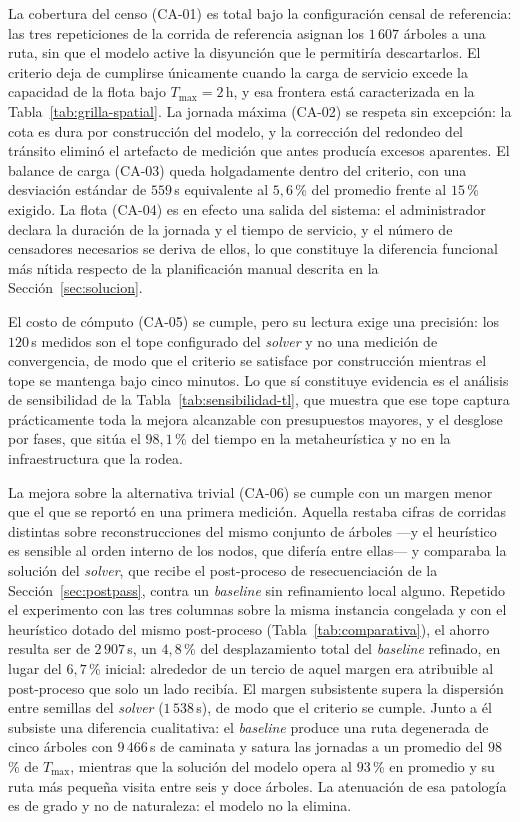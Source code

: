 La cobertura del censo (CA-01) es total bajo la configuración censal de referencia:
las tres repeticiones de la corrida de referencia asignan los $1\,607$ árboles a una
ruta, sin que el modelo active la disyunción que le permitiría descartarlos. El
criterio deja de cumplirse únicamente cuando la carga de servicio excede la capacidad
de la flota bajo $T_{\max}=2$\,h, y esa frontera está caracterizada en la
Tabla~\ref{tab:grilla-spatial}. La jornada máxima (CA-02) se respeta sin excepción:
la cota es dura por construcción del modelo, y la corrección del redondeo del tránsito
eliminó el artefacto de medición que antes producía excesos aparentes. El balance de
carga (CA-03) queda holgadamente dentro del criterio, con una desviación estándar de
$559$\,s equivalente al $5{,}6$\,\% del promedio frente al $15$\,\% exigido. La flota
(CA-04) es en efecto una salida del sistema: el administrador declara la duración de
la jornada y el tiempo de servicio, y el número de censadores necesarios se deriva de
ellos, lo que constituye la diferencia funcional más nítida respecto de la
planificación manual descrita en la Sección~\ref{sec:solucion}.

El costo de cómputo (CA-05) se cumple, pero su lectura exige una precisión: los
$120$\,s medidos son el tope configurado del \textit{solver} y no una medición de
convergencia, de modo que el criterio se satisface por construcción mientras el tope
se mantenga bajo cinco minutos. Lo que sí constituye evidencia es el análisis de
sensibilidad de la Tabla~\ref{tab:sensibilidad-tl}, que muestra que ese tope captura
prácticamente toda la mejora alcanzable con presupuestos mayores, y el desglose por
fases, que sitúa el $98{,}1$\,\% del tiempo en la metaheurística y no en la
infraestructura que la rodea.

La mejora sobre la alternativa trivial (CA-06) se cumple con un margen menor que el
que se reportó en una primera medición. Aquella restaba cifras de corridas distintas
sobre reconstrucciones del mismo conjunto de árboles ---y el heurístico es sensible al
orden interno de los nodos, que difería entre ellas--- y comparaba la solución del
\textit{solver}, que recibe el post-proceso de resecuenciación de la
Sección~\ref{sec:postpass}, contra un \textit{baseline} sin refinamiento local alguno.
Repetido el experimento con las tres columnas sobre la misma instancia congelada y con
el heurístico dotado del mismo post-proceso (Tabla~\ref{tab:comparativa}), el ahorro
resulta ser de $2\,907$\,s, un $4{,}8$\,\% del desplazamiento total del
\textit{baseline} refinado, en lugar del $6{,}7$\,\% inicial: alrededor de un tercio de
aquel margen era atribuible al post-proceso que solo un lado recibía. El margen
subsistente supera la dispersión entre semillas del \textit{solver} ($1\,538$\,s), de
modo que el criterio se cumple. Junto a él subsiste una diferencia cualitativa: el
\textit{baseline} produce una ruta degenerada de cinco árboles con $9\,466$\,s de
caminata y satura las jornadas a un promedio del $98$\,\% de $T_{\max}$, mientras que
la solución del modelo opera al $93$\,\% en promedio y su ruta más pequeña visita entre
seis y doce árboles. La atenuación de esa patología es de grado y no de naturaleza: el
modelo no la elimina.

